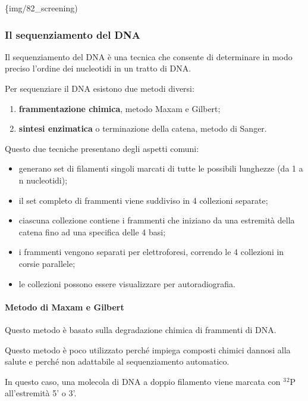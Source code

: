 \documentclass[]{article}
\begin{document}
\{img/82\_screening)

\subsubsection{Il sequenziamento del
DNA}\label{il-sequenziamento-del-dna}

Il sequenziamento del DNA è una tecnica che consente di determinare in
modo preciso l'ordine dei nucleotidi in un tratto di DNA.

Per sequenziare il DNA esistono due metodi diversi:

\begin{enumerate}
\def\labelenumi{\arabic{enumi}.}
\itemsep1pt\parskip0pt
\item
  \textbf{frammentazione chimica}, metodo Maxam e Gilbert;
\item
  \textbf{sintesi enzimatica} o terminazione della catena, metodo di
  Sanger.
\end{enumerate}

Questo due tecniche presentano degli aspetti comuni:

\begin{itemize}
\itemsep1pt\parskip0pt
\item
  generano set di filamenti singoli marcati di tutte le possibili
  lunghezze (da 1 a n nucleotidi);
\item
  il set completo di frammenti viene suddiviso in 4 collezioni separate;
\item
  ciascuna collezione contiene i frammenti che iniziano da una estremità
  della catena fino ad una specifica delle 4 basi;
\item
  i frammenti vengono separati per elettroforesi, correndo le 4
  collezioni in corsie parallele;
\item
  le collezioni possono essere visualizzare per autoradiografia.
\end{itemize}

\paragraph{Metodo di Maxam e Gilbert}\label{metodo-di-maxam-e-gilbert}

Questo metodo è basato sulla degradazione chimica di frammenti di DNA.

Questo metodo è poco utilizzato perché impiega composti chimici dannosi
alla salute e perché non adattabile al sequenziamento automatico.

In questo caso, una molecola di DNA a doppio filamento viene marcata con
\(^3\)\(^2\)P all'estremità 5' o 3'.
\end{document}
